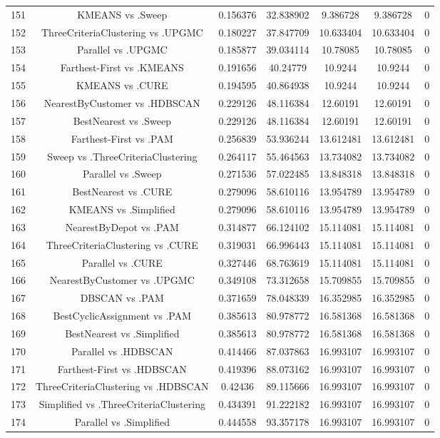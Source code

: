 \documentclass[a4paper,10pt]{article}
\begin{document}
\begin{landscape}
\begin{table}[!htp]
\begin{tabular}{ccccccc}
151&KMEANS vs .Sweep&0.156376&32.838902&9.386728&9.386728&0\\
152&ThreeCriteriaClustering vs .UPGMC&0.180227&37.847709&10.633404&10.633404&0\\
153&Parallel vs .UPGMC&0.185877&39.034114&10.78085&10.78085&0\\
154&Farthest-First vs .KMEANS&0.191656&40.24779&10.9244&10.9244&0\\
155&KMEANS vs .CURE&0.194595&40.864938&10.9244&10.9244&0\\
156&NearestByCustomer vs .HDBSCAN&0.229126&48.116384&12.60191&12.60191&0\\
157&BestNearest vs .Sweep&0.229126&48.116384&12.60191&12.60191&0\\
158&Farthest-First vs .PAM&0.256839&53.936244&13.612481&13.612481&0\\
159&Sweep vs .ThreeCriteriaClustering&0.264117&55.464563&13.734082&13.734082&0\\
160&Parallel vs .Sweep&0.271536&57.022485&13.848318&13.848318&0\\
161&BestNearest vs .CURE&0.279096&58.610116&13.954789&13.954789&0\\
162&KMEANS vs .Simplified&0.279096&58.610116&13.954789&13.954789&0\\
163&NearestByDepot vs .PAM&0.314877&66.124102&15.114081&15.114081&0\\
164&ThreeCriteriaClustering vs .CURE&0.319031&66.996443&15.114081&15.114081&0\\
165&Parallel vs .CURE&0.327446&68.763619&15.114081&15.114081&0\\
166&NearestByCustomer vs .UPGMC&0.349108&73.312658&15.709855&15.709855&0\\
167&DBSCAN vs .PAM&0.371659&78.048339&16.352985&16.352985&0\\
168&BestCyclicAssignment vs .PAM&0.385613&80.978772&16.581368&16.581368&0\\
169&BestNearest vs .Simplified&0.385613&80.978772&16.581368&16.581368&0\\
170&Parallel vs .HDBSCAN&0.414466&87.037863&16.993107&16.993107&0\\
171&Farthest-First vs .HDBSCAN&0.419396&88.073162&16.993107&16.993107&0\\
172&ThreeCriteriaClustering vs .HDBSCAN&0.42436&89.115666&16.993107&16.993107&0\\
173&Simplified vs .ThreeCriteriaClustering&0.434391&91.222182&16.993107&16.993107&0\\
174&Parallel vs .Simplified&0.444558&93.357178&16.993107&16.993107&0\\

\end{tabular}
\end{table}
\end{landscape}
\end{document}
